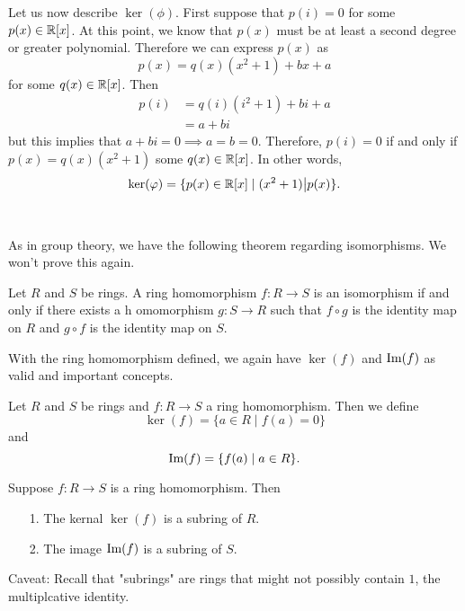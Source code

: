     Let us now describe $\ker(\phi)$. First suppose that $p(i) =
    0$ for some $p(x) \in \mathbb{R}[x]$. At this point, we know that $p(x)$ must be at least a
    second degree or greater polynomial. Therefore we can express $p(x)$ 
    as 
    \[
        p(x) = q(x)(x^2 + 1) + bx + a
    \]
    for some $q(x) \in \mathbb{R}[x]$. Then 
    \begin{align*}
        p(i) &= q(i)(i^2 + 1) + bi + a \\
            &= a + bi
    \end{align*}
    but this implies that $a + bi = 0 \implies a = b = 0$.
    Therefore, $p(i) = 0$ if and only if $p(x) = q(x)(x^2 + 1)$
    some $q(x) \in \mathbb{R}[x]$. In other words, 
    \[
        \ker(\varphi) = \{p(x) \in \mathbb{R}[x] \mid (x^2 + 1)\big|p(x)\}.
    \]
    \\
    \\
    As in group theory, we have the following theorem regarding
    isomorphisms. We won't prove this again. 


    \begin{thm}
        Let $R$ and $S$ be rings. A ring homomorphism $f: R \to S$ is an
        isomorphism if and only if there exists a h             omomorphism $g:
        S \to R$ such that $f \circ g$ is the identity map on
        $R$ and $g \circ f$ is the identity map on
        $S$.
    \end{thm}

    With the ring homomorphism defined, we again have $\ker(f)$
    and $\mbox{Im}(f)$ as valid and important concepts.
    \begin{definition}
        Let $R$ and $S$ be rings and $f: R \to S$ a ring
        homomorphism. Then we define 
        \[
            \ker(f) = \{a \in R \mid f(a) = 0\}  
        \]
        and 
        \[
            \mbox{Im}(f) = \{f(a) \mid a \in R\}.
        \]
    \end{definition}

    \begin{proposition}
        Suppose $f: R \to S$ is a ring homomorphism. Then 
        \begin{itemize}
            \item[1.] The kernal $\ker(f)$ is a subring of $R$.
            \item[2.] The image $\mbox{Im}(f)$ is a subring of $S$.  
        \end{itemize}
    \end{proposition}
    Caveat: Recall that "subrings" are rings that might not
    possibly contain $1$, the multiplcative identity.

